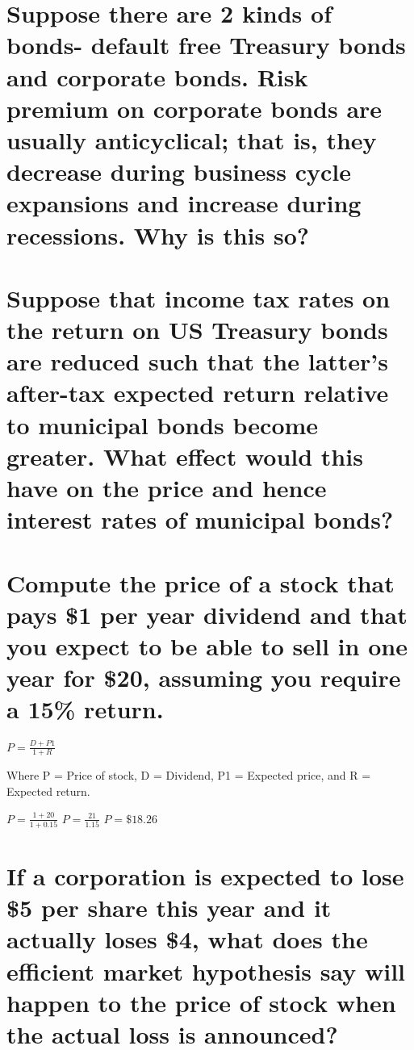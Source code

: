 \documentclass[12pt]{article}
\begin{document}
\section{Suppose there are 2 kinds of bonds- default free Treasury bonds and
corporate bonds. Risk premium on corporate bonds are usually anticyclical; 
that is, they decrease during business cycle expansions and increase during
recessions. Why is this so?}

\section{Suppose that income tax rates on the return on US Treasury bonds are
reduced such that the latter's after-tax expected return relative to municipal
bonds become greater. What effect would this have on the price and hence 
interest rates of municipal bonds?}

\section{Compute the price of a stock that pays \$1 per year dividend and that
you expect to be able to sell in one year for \$20, assuming you require a 
15\% return.}

\indent $P = \frac{D + P1}{1 + R}$

Where P = Price of stock, D = Dividend, P1 = Expected price, and R = Expected 
return.

\indent $P = \frac{1 + 20}{1 + 0.15}$ \indent $P = \frac{21}{1.15}$ 
\indent $P = \$18.26$

\section{If a corporation is expected to lose \$5 per share this year and it
actually loses \$4, what does the efficient market hypothesis say will happen 
to the price of stock when the actual loss is announced?}
\end{document}
